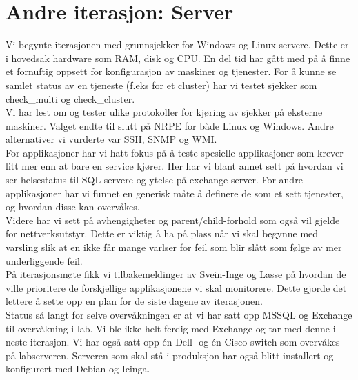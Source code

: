 

\date{Onsdag 20. Februar 2013}




\maketitle
\section*{Andre iterasjon: Server}
\noindent Vi begynte iterasjonen med grunnsjekker for Windows og Linux-servere. Dette er i hovedsak hardware som RAM, disk og CPU. En del tid har gått med på å finne et fornuftig oppsett for konfigurasjon av maskiner og tjenester. For å kunne se samlet status av en tjeneste (f.eks for et cluster) har vi testet sjekker som check\_multi og check\_cluster. \\

\noindent Vi har lest om og tester ulike protokoller for kjøring av sjekker på eksterne maskiner. Valget endte til slutt på NRPE for både Linux og Windows. Andre alternativer vi vurderte var SSH, SNMP og WMI. \\

\noindent For applikasjoner har vi hatt fokus på å teste spesielle applikasjoner som krever litt mer enn at bare en service kjører. Her har vi blant annet sett på hvordan vi ser helsestatus til SQL-servere og ytelse på exchange server. For andre applikasjoner har vi funnet en generisk måte å definere de som et sett tjenester, og hvordan disse kan overvåkes. \\

\noindent Videre har vi sett på avhengigheter og parent/child-forhold som også vil gjelde for nettverksutstyr. Dette er viktig å ha på plass når vi skal begynne med varsling slik at en ikke får mange varlser for feil som blir slått som følge av mer underliggende feil.\\

\noindent På iterasjonsmøte fikk vi tilbakemeldinger av Svein-Inge og Lasse på hvordan de ville prioritere de forskjellige applikasjonene vi skal monitorere. Dette gjorde det lettere å sette opp en plan for de siste dagene av iterasjonen. \\

\noindent Status så langt for selve overvåkningen er at vi har satt opp MSSQL og Exchange til overvåkning i lab. Vi ble ikke helt ferdig med Exchange og tar med denne i neste iterasjon. Vi har også satt opp én Dell- og én Cisco-switch som overvåkes på labserveren. Serveren som skal stå i produksjon har også blitt installert og konfigurert med Debian og Icinga.\\



